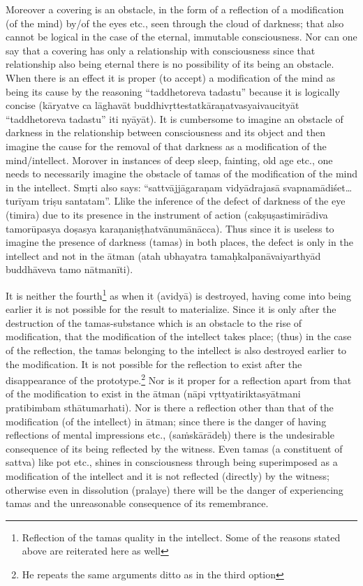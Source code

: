 Moreover a covering is an obstacle, in the form of a reflection of a modification (of the mind) by/of the eyes etc., seen through the cloud of darkness; that also cannot be logical in the case of the eternal, immutable consciousness. Nor can one say that a covering has only a relationship with consciousness since that relationship also being eternal there is no possibility of its being an obstacle. When there is an effect it is proper (to accept) a modification of the mind as being its cause by the reasoning “taddhetoreva tadastu” because it is logically concise (kāryatve ca lāghavāt buddhivṛttestatkāraṇatvasyaivaucityāt “taddhetoreva tadastu” iti nyāyāt). It is cumbersome to imagine an obstacle of darkness in the relationship between consciousness and its object and then imagine the cause for the removal of that darkness as a modification of the mind/intellect. Morover in instances of deep sleep, fainting, old age etc., one needs to necessarily imagine the obstacle of tamas of the modification of the mind in the intellect. Smṛti also says: “sattvājjāgaraṇam vidyādrajasā svapnamādiśet…turīyam triṣu santatam”.  Llike the inference of the defect of darkness of the eye (timira) due to its presence in the instrument of action (cakṣuṣastimirādiva tamorūpasya doṣasya karaṇaniṣṭhatvānumānācca). Thus since it is useless to imagine the presence of  darkness (tamas) in both places, the defect is only in the intellect and not in the ātman (atah ubhayatra tamaḥkalpanāvaiyarthyād buddhāveva tamo nātmanīti).

It is neither the fourth\footnote{Reflection of the tamas quality in the intellect. Some of the reasons stated above are reiterated here as well} as when it (avidyā) is destroyed, having come into being earlier it is not possible for the result to materialize. Since it is only after the destruction of the tamas-substance which is an obstacle to the rise of modification, that the modification of the intellect takes place; (thus) in the case of the reflection, the tamas belonging to the intellect is also destroyed earlier to the modification. It is not possible for the reflection to exist after the disappearance of the prototype.\footnote{He repeats the same arguments ditto as in the third option} Nor is it proper for a reflection apart from that of the modification to exist in the ātman (nāpi vṛttyatiriktasyātmani pratibimbam sthātumarhati). Nor is there a reflection other than that of the modification (of the intellect) in ātman; since there is the danger of having reflections of mental impressions etc., (saṁskārādeḥ) there is the undesirable consequence of its being reflected by the witness. Even tamas (a constituent of sattva) like pot etc., shines in consciousness through being superimposed as a modification of the intellect and it is not reflected (directly) by the witness; otherwise even in dissolution (pralaye) there will be the danger of experiencing tamas and the unreasonable consequence of its remembrance.

